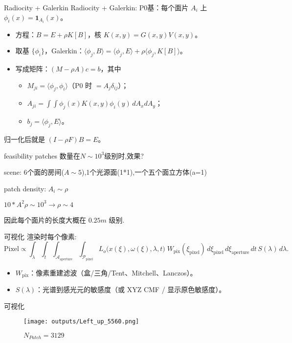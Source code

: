 \documentclass[10pt,aspectratio=169]{beamer}
\begin{document}
\begin{frame}{Radiocity + Galerkin}
    Radiocity + Galerkin:
    P0基：每个面片 $A_i$ 上 $\phi_i(x)=\mathbf{1}_{A_i}(x)$。
    \begin{itemize}
        \item 方程：$B = E + \rho K[B]$，核 $K(x,y)=G(x,y)V(x,y)$。
        \item 取基 $\{\phi_i\}$，Galerkin：$\langle \phi_j, B\rangle = \langle \phi_j, E\rangle + \rho \langle \phi_j, K[B]\rangle$。
        \item 写成矩阵：$(M - \rho A) c = b$，其中
        \begin{itemize}
            \item $M_{ji}=\langle \phi_j,\phi_i\rangle$（P0 时 $=A_j\delta_{ij}$）；
            \item $A_{ji}=\int\!\!\int \phi_j(x)K(x,y)\phi_i(y)\,dA_x dA_y$；
            \item $b_j=\langle \phi_j,E\rangle$。
        \end{itemize}
    \end{itemize}
  归一化后就是 $(I-\rho F)B=E$。

\end{frame}

\begin{frame}{feasibility}
patches 数量在$N\sim 10^3$级别时,效果?

scene: 6个面的房间($A\sim 5$),1个光源面(1*1),一个五个面立方体(a=1)

patch density: $A_i\sim \rho$

$10*A^2\rho \sim 10^3\rightarrow \rho \sim 4$

因此每个面片的长度大概在 $0.25m$ 级别.
\end{frame}

\begin{frame}{可视化}
渲染时每个像素:
$$
\text{Pixel} \propto \int_{\lambda}\!\!\int_{t}\!\!\int_{\mathcal{A}_{\text{aperture}}}\!\!\int_{\mathcal{P}_{\text{pixel}}}
L_o\!\big(x(\xi),\omega(\xi),\lambda,t\big)\;
W_{\text{pix}}(\xi_{\text{pixel}})\, d\xi_{\text{pixel}}\, d\xi_{\text{aperture}}\, dt\, S(\lambda)\, d\lambda .
$$


\begin{itemize}
    \item $W_{\text{pix}}$：像素重建滤波（盒/三角/Tent、Mitchell、Lanczos）。
    \item $S(\lambda)$：光谱到感光元的敏感度（或 XYZ CMF / 显示原色敏感度）。
\end{itemize}
\end{frame}

\begin{frame}{可视化}
    \begin{figure}
        \centering
        \texttt{[image: outputs/Left\_up\_5560.png]}
        \caption{$N_{Patch}=3129$}
    \end{figure}
\end{frame}



\end{document}
